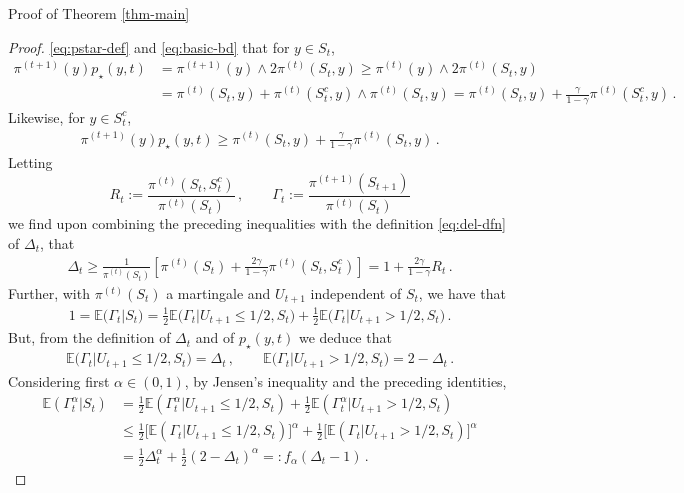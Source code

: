 \documentclass[12pt,reqno]{amsart}
\numberwithin{equation}{section}
\theoremstyle{definition}
\begin{document}
\begin{section}{Proof of Theorem \ref{thm-main}}
\begin{proof}
\eqref{eq:pstar-def} and \eqref{eq:basic-bd} that for $y \in S_t$,
\begin{align*}
\pi^{(t+1)}(y) p_\star(y,t) 
&=\pi^{(t+1)}(y)\wedge2\pi^{(t)}(S_t,y) \ge\pi^{(t)}(y)\wedge2\pi^{(t)}(S_t,y)\\
&=\pi^{(t)}(S_t,y)+\pi^{(t)}(S_t^c,y)\wedge\pi^{(t)}(S_t,y)
=\pi^{(t)}(S_t,y)+\frac{\gamma}{1-\gamma}\pi^{(t)}(S_t^c,y)\,.
\end{align*}
Likewise, for $y\in S_t^c$,
\begin{align*}
\pi^{(t+1)}(y) p_\star(y,t) 
\ge\pi^{(t)}(S_t,y)+\frac{\gamma}{1-\gamma}\pi^{(t)}(S_t,y)\,.
\end{align*}
Letting 
$$
R_t:=\frac{\pi^{(t)}(S_t, S_t^c)}{\pi^{(t)}(S_t)} \,,\quad 
\quad 
\Gamma_t:=\frac{\pi^{(t+1)}(S_{t+1})}{\pi^{(t)}(S_t)}
$$ 
we find upon combining the preceding inequalities 
with the definition \eqref{eq:del-dfn} of $\Delta_t$, that
\begin{align}\label{eq:del-ineq}
\Delta_t \ge \frac{1}{\pi^{(t)}(S_t)} [\pi^{(t)}(S_t)+
\frac{2\gamma}{1-\gamma}\pi^{(t)}(S_t,S_t^c)] = 
1+\frac{2\gamma}{1-\gamma}R_t\,.
\end{align}
Further, with $\pi^{(t)}(S_t)$ a martingale and 
$U_{t+1}$ independent of $S_t$, we have that 
\begin{align*}
1 = \mathbb{E}\big( \Gamma_t \big| S_t \big)
= \frac{1}{2} \mathbb{E} \big(\Gamma_t \big| U_{t+1}\le 1/2, S_t\big) + 
\frac{1}{2} \mathbb{E}\big( \Gamma_t \big|U_{t+1}> 1/2,S_t \big) \,.
\end{align*}
But, from the definition of $\Delta_t$ and of $p_\star(y,t)$ we deduce that 
\begin{align*}
 \mathbb{E} \big(\Gamma_t \big| U_{t+1}\le 1/2, S_t\big) = \Delta_t \,, \quad
\quad \mathbb{E}\big(\Gamma_t \big|U_{t+1}> 1/2,S_t \big)=2-\Delta_t \,.
\end{align*}
Considering first {$\alpha \in (0,1)$},
by Jensen's inequality and the preceding identities,
\begin{align}
\mathbb{E}(\Gamma_t^\alpha|S_t)&=\frac{1}{2} 
\mathbb{E}(\Gamma_t^\alpha|U_{t+1}\le 1/2, S_t)+
\frac{1}{2} \mathbb{E}(\Gamma_t^\alpha|U_{t+1}> 1/2, S_t)\nonumber \\
&\le \frac{1}{2} 
\Big[\mathbb{E}(\Gamma_t |U_{t+1}\le 1/2, S_t)\Big]^\alpha+
\frac{1}{2} \Big[\mathbb{E}(\Gamma_t|U_{t+1}> 1/2, S_t)\Big]^\alpha \nonumber \\
&= \frac{1}{2} \Delta_t^\alpha + \frac{1}{2} (2-\Delta_t)^\alpha
=: f_\alpha (\Delta_t-1) \,. \label{eq:f-alpha-bd}
\end{align}

\end{proof}
\end{section}
\end{document}
